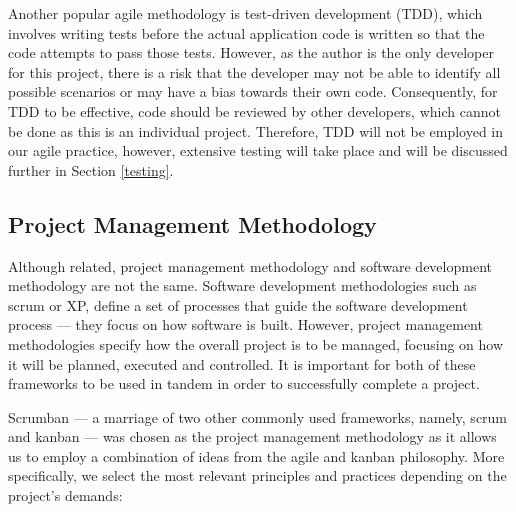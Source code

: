 \documentclass[12pt, a4paper]{article}
\newcommand{\np}
    {
    \vskip 0.4cm
    }
\begin{document}
\np
Another popular agile methodology is test-driven development (TDD), which involves writing tests before the actual application code is written so that the code attempts to pass those tests. However, as the author is the only developer for this project, there is a risk that the developer may not be able to identify all possible scenarios or may have a bias towards their own code. Consequently, for TDD to be effective, code should be reviewed by other developers, which cannot be done as this is an individual project. Therefore, TDD will not be employed in our agile practice, however, extensive testing will take place and will be discussed further in Section \ref{testing}.

\subsection{Project Management Methodology}

Although related, project management methodology and software development methodology are not the same. Software development methodologies such as scrum or XP, define a set of processes that guide the software development process --- they focus on how software is built. However, project management methodologies specify how the overall project is to be managed, focusing on how it will be planned, executed and controlled. It is important for both of these frameworks to be used in tandem in order to successfully complete a project.
\np
Scrumban --- a marriage of two other commonly used frameworks, namely, scrum and kanban --- was chosen as the project management methodology as it allows us to employ a combination of ideas from the agile and kanban philosophy. More specifically, we select the most relevant principles and practices depending on the project's demands:
\end{document}
